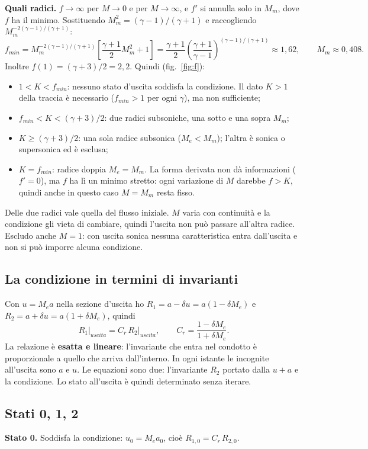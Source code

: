 \documentclass[11pt,a4paper]{article}
\newcommand{\Ru}{R_1}
\newcommand{\Rd}{R_2}
\newcommand{\upa}{u+a}
\newcommand{\Me}{M_e}
\newcommand{\Cr}{C_r}
\begin{document}
\textbf{Quali radici.} $f\to\infty$ per $M\to0$ e per $M\to\infty$, e $f'$ si annulla solo in $M_m$, dove $f$ ha il
minimo. Sostituendo $M_m^2=(\gamma-1)/(\gamma+1)$ e raccogliendo $M_m^{-2(\gamma-1)/(\gamma+1)}$:
\[
  f_{min}=M_m^{-2(\gamma-1)/(\gamma+1)}\left[\frac{\gamma+1}{2}M_m^2+1\right]
  =\frac{\gamma+1}{2}\left(\frac{\gamma+1}{\gamma-1}\right)^{(\gamma-1)/(\gamma+1)}\approx1{,}62,
  \qquad M_m\approx0{,}408 .
\]
Inoltre $f(1)=(\gamma+3)/2=2{,}2$. Quindi (fig.~\ref{fig:f}):
\begin{itemize}
  \item $1<K<f_{min}$: nessuno stato d'uscita soddisfa la condizione. Il dato $K>1$ della traccia è necessario
        ($f_{min}>1$ per ogni $\gamma$), ma non sufficiente;
  \item $f_{min}<K<(\gamma+3)/2$: due radici subsoniche, una sotto e una sopra $M_m$;
  \item $K\ge(\gamma+3)/2$: una sola radice subsonica ($\Me<M_m$); l'altra è sonica o supersonica ed è esclusa;
  \item $K=f_{min}$: radice doppia $\Me=M_m$. La forma derivata non dà informazioni ($f'=0$), ma $f$ ha lì un
        minimo stretto: ogni variazione di $M$ darebbe $f>K$, quindi anche in questo caso $M=M_m$ resta fisso.
\end{itemize}
Delle due radici vale quella del flusso iniziale. $M$ varia con continuità e la condizione gli vieta di cambiare,
quindi l'uscita non può passare all'altra radice. Escludo anche $M=1$: con uscita sonica nessuna caratteristica
entra dall'uscita e non si può imporre alcuna condizione.

\subsection{La condizione in termini di invarianti}
Con $u=\Me a$ nella sezione d'uscita ho $\Ru=a-\delta u=a(1-\delta\Me)$ e $\Rd=a+\delta u=a(1+\delta\Me)$, quindi
\[
  \Ru\big|_{uscita}=\Cr\,\Rd\big|_{uscita},\qquad \Cr=\frac{1-\delta\Me}{1+\delta\Me} .
\]
La relazione è \textbf{esatta e lineare}: l'invariante che entra nel condotto è proporzionale a quello che arriva
dall'interno. In ogni istante le incognite all'uscita sono $a$ e $u$. Le equazioni sono due: l'invariante $\Rd$
portato dalla $\upa$ e la condizione. Lo stato all'uscita è quindi determinato senza iterare.

\subsection{Stati 0, 1, 2}
\textbf{Stato 0.} Soddisfa la condizione: $u_0=\Me a_0$, cioè $R_{1,0}=\Cr\,R_{2,0}$.
\end{document}

